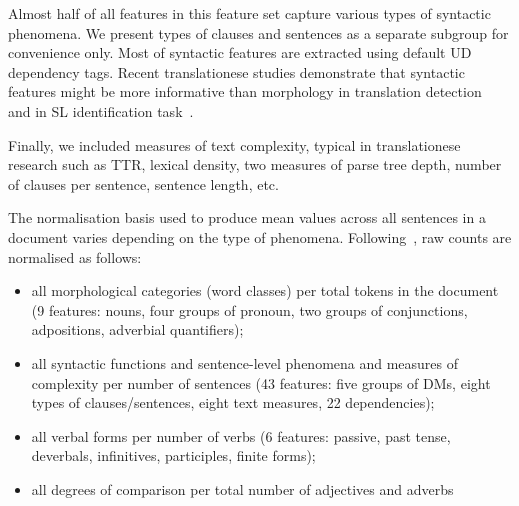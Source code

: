 Almost half of all features in this feature set capture various types of syntactic phenomena. We present types of clauses and sentences as a separate subgroup for convenience only. Most of syntactic features are extracted using default UD dependency tags. Recent translationese studies demonstrate that syntactic features might be more informative than morphology in translation detection~\cite{Hu2021} and in SL identification task~\cite{Chowdhury2020}.  

Finally, we included measures of text complexity, typical in translationese research such as \gls{TTR}, lexical density, two measures of parse tree depth, number of clauses per sentence, sentence length, etc. 

The normalisation basis used to produce mean values across all sentences in a document varies depending on the type of phenomena. Following~\citet{Evert2017}, raw counts are normalised as follows:
\begin{itemize}
	\item all morphological categories (word classes) per total tokens in the document (9 features: nouns, four groups of pronoun, two groups of conjunctions, adpositions, adverbial quantifiers);
	\item all syntactic functions and sentence-level phenomena and measures of complexity per number of sentences (43 features: five groups of DMs, eight types of clauses/sentences, eight text measures, 22 dependencies);
	\item all verbal forms per number of verbs (6 features: passive, past tense, deverbals, infinitives, participles, finite forms);
	\item all degrees of comparison per total number of adjectives and adverbs
\end{itemize}

